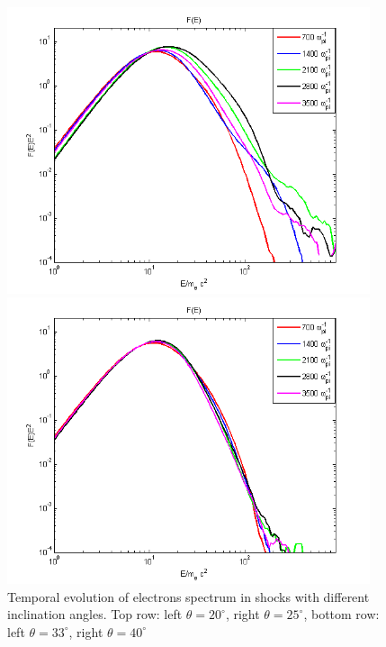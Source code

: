 \documentclass[a4paper]{jpconf}
\begin{document}
\begin{figure}[h!]
\begin{minipage}{0.49\textwidth}
			\includegraphics[width=0.95\textwidth]{fig/spectrum33.png} 
		\end{minipage}
		\begin{minipage}{0.49\textwidth}
			\centering
			\includegraphics[width=0.95\textwidth]{fig/spectrum40.png} 
		\end{minipage}
		\caption{Temporal evolution of electrons spectrum in shocks with different inclination angles. Top row: left $\theta = 20^\circ$, right $\theta = 25^\circ$, bottom row: left $\theta = 33^\circ$, right $\theta = 40^\circ$}
		\label{spectrume}
	\end{figure}
\end{document}
